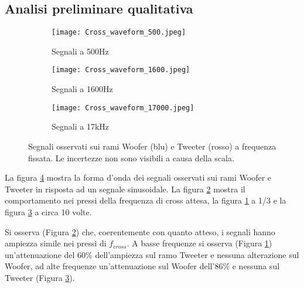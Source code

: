 \documentclass[../Relazione_circuiti]{subfiles}
\begin{document}
\subsection{Analisi preliminare qualitativa}

\begin{figure}[H]
\centering

\begin{subfigure}[b]{0.3\textwidth}
\centering
\texttt{[image: Cross\_waveform\_500.jpeg]}

\caption{Segnali a 500Hz}
\label{fig:signal_500}

\end{subfigure}

\hfill

\begin{subfigure}[b]{0.3\textwidth}
\centering
\texttt{[image: Cross\_waveform\_1600.jpeg]}

\caption{Segnali a 1600Hz}
\label{fig:signal_1600}

\end{subfigure}

\hfill

\begin{subfigure}[b]{0.3\textwidth}
\centering
\texttt{[image: Cross\_waveform\_17000.jpeg]}

\caption{Segnali a 17kHz}
\label{fig:signal_17k}

\end{subfigure}

\caption{Segnali osservati sui rami Woofer (blu) e Tweeter (rosso) a frequenza fissata. Le incertezze non sono visibili a causa della scala.}
\label{fig:signal_waveforms}

\end{figure}

La figura \ref{fig:signal_waveforms} mostra la forma d'onda dei segnali osservati sui rami Woofer e Tweeter in risposta ad un segnale sinusoidale. La figura \ref{fig:signal_1600} mostra il comportamento nei pressi della frequenza di cross attesa, la figura \ref{fig:signal_500} a 1/3 e la figura \ref{fig:signal_17k} a circa 10 volte.

Si osserva (Figura \ref{fig:signal_1600}) che, coerentemente con quanto atteso, i segnali hanno ampiezza simile nei pressi di $f_{cross}$. A basse frequenze si osserva (Figura \ref{fig:signal_500}) un'attenuazione del 60\% dell'ampiezza sul ramo Tweeter e nessuna alterazione sul Woofer, ad alte frequenze un'attenuazione sul Woofer dell'86\% e nessuna sul Tweeter (Figura \ref{fig:signal_17k}).
\end{document}
